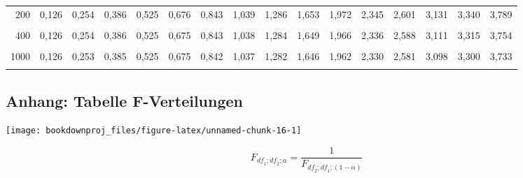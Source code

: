 \documentclass[
  ngerman,
]{article}
\begin{document}
\begin{table}[!h]
{\begin{tabular}{>{}r|rrrrrrrrrrrrrrr}
200 & 0,126 & 0,254 & 0,386 & 0,525 & 0,676 & 0,843 & 1,039 & 1,286 & 1,653 & 1,972 & 2,345 & 2,601 & 3,131 & 3,340 & 3,789\\
\addlinespace
\cellcolor{gray!6}{300} & \cellcolor{gray!6}{0,126} & \cellcolor{gray!6}{0,254} & \cellcolor{gray!6}{0,386} & \cellcolor{gray!6}{0,525} & \cellcolor{gray!6}{0,675} & \cellcolor{gray!6}{0,843} & \cellcolor{gray!6}{1,038} & \cellcolor{gray!6}{1,284} & \cellcolor{gray!6}{1,650} & \cellcolor{gray!6}{1,968} & \cellcolor{gray!6}{2,339} & \cellcolor{gray!6}{2,592} & \cellcolor{gray!6}{3,118} & \cellcolor{gray!6}{3,323} & \cellcolor{gray!6}{3,765}\\
400 & 0,126 & 0,254 & 0,386 & 0,525 & 0,675 & 0,843 & 1,038 & 1,284 & 1,649 & 1,966 & 2,336 & 2,588 & 3,111 & 3,315 & 3,754\\
\cellcolor{gray!6}{500} & \cellcolor{gray!6}{0,126} & \cellcolor{gray!6}{0,253} & \cellcolor{gray!6}{0,386} & \cellcolor{gray!6}{0,525} & \cellcolor{gray!6}{0,675} & \cellcolor{gray!6}{0,842} & \cellcolor{gray!6}{1,038} & \cellcolor{gray!6}{1,283} & \cellcolor{gray!6}{1,648} & \cellcolor{gray!6}{1,965} & \cellcolor{gray!6}{2,334} & \cellcolor{gray!6}{2,586} & \cellcolor{gray!6}{3,107} & \cellcolor{gray!6}{3,310} & \cellcolor{gray!6}{3,747}\\
1000 & 0,126 & 0,253 & 0,385 & 0,525 & 0,675 & 0,842 & 1,037 & 1,282 & 1,646 & 1,962 & 2,330 & 2,581 & 3,098 & 3,300 & 3,733\\
\cellcolor{gray!6}{$z$} & \cellcolor{gray!6}{0,126} & \cellcolor{gray!6}{0,253} & \cellcolor{gray!6}{0,385} & \cellcolor{gray!6}{0,524} & \cellcolor{gray!6}{0,674} & \cellcolor{gray!6}{0,842} & \cellcolor{gray!6}{1,036} & \cellcolor{gray!6}{1,282} & \cellcolor{gray!6}{1,645} & \cellcolor{gray!6}{1,960} & \cellcolor{gray!6}{2,326} & \cellcolor{gray!6}{2,576} & \cellcolor{gray!6}{3,090} & \cellcolor{gray!6}{3,291} & \cellcolor{gray!6}{3,719}\\
\bottomrule
\end{tabular}}
\end{table}

\pagebreak

\hypertarget{anhang-tabelle-f-verteilungen}{%
\subsection{Anhang: Tabelle F-Verteilungen}\label{anhang-tabelle-f-verteilungen}}

\begin{multicols}{2}


\begin{center}\texttt{[image: bookdownproj\_files/figure-latex/unnamed-chunk-16-1]} \end{center}

\[
F_{\textit{df}_1;\textit{df}_2;\alpha}=\frac{1}{F_{\textit{df}_2;\textit{df}_1;(1-\alpha)}} 
\]

\end{multicols}
\end{document}
